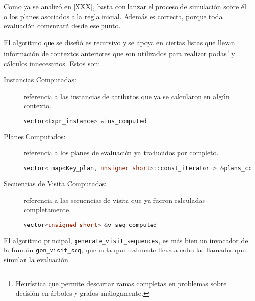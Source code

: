 Como ya se analizó en \ref{XXX}, basta con lanzar el proceso de simulación sobre él o los planes asociados a la regla inicial. Además es correcto, porque toda evaluación comenzará desde ese punto.

El algoritmo que se diseñó es recursivo y se apoya en ciertas listas que llevan información de contextos anteriores que son utilizados para realizar podas\footnote{Heurística que permite descartar ramas completas en problemas sobre decisión en árboles y grafos análogamente. } y cálculos innecesarios. Estos son:

\begin{description}
\item [Instancias Computadas:] referencia a las instancias de atributos que ya se calcularon en algún contexto.
\begin{lstlisting}[language=C++, basicstyle=\scriptsize]
vector<Expr_instance> &ins_computed
\end{lstlisting}

\item [Planes Computados:] referencia a los planes de evaluación ya traducidos por completo.
\begin{lstlisting}[language=C++, basicstyle=\scriptsize]
vector< map<Key_plan, unsigned short>::const_iterator > &plans_computed
\end{lstlisting}

\item [Secuencias de Visita Computadas:] referencia a las secuencias de visita que ya fueron calculadas completamente.
\begin{lstlisting}[language=C++, basicstyle=\scriptsize]
vector<unsigned short> &v_seq_computed
\end{lstlisting}
\end{description}

El algoritmo principal, \texttt{generate\_visit\_sequences}, es más bien un invocador de la función \texttt{gen\_visit\_seq}, que es la que realmente lleva a cabo las llamadas que simulan la evaluación.

